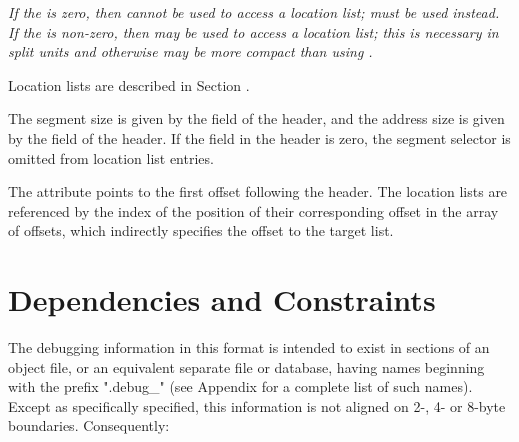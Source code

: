 \textit{\bb
If the \HFNoffsetentrycount{} is zero, then \DWFORMloclistx{} cannot 
be used to access a location list; \DWFORMsecoffset{} must be used 
instead. If the \HFNoffsetentrycount{} is non-zero, then \DWFORMloclistx{} 
may be used to access a location list; this is necessary in split units and
otherwise may be more compact than using \DWFORMsecoffset.
\eb
}

Location lists are
described in Section .

The segment size is given by the
\HFNsegmentselectorsize{} field of the header, and the address size is
given by the \HFNaddresssize{} field of the header. If the
\HFNsegmentselectorsize{} field in the header is zero, the segment
selector is omitted from location list entries.

The \DWATloclistsbase{} attribute points to the first offset 
following the header. The location lists are referenced
by the index of the position of their corresponding offset in the
array of offsets, which indirectly specifies the offset to the
target list.

\section{Dependencies and Constraints}
\label{datarep:dependenciesandconstraints}
The debugging information in this format is intended to
exist in sections of an object file, or an equivalent
separate file or database, having names beginning with
the prefix ".debug\_" (see Appendix 
for a complete list of such names). 
Except as specifically specified, this information is not 
aligned on 2-, 4- or 8-byte boundaries. Consequently:

